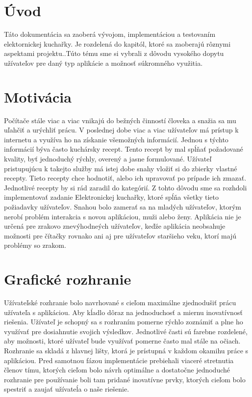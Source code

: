 \documentclass[12pt,a4paper,titlepage,final]{article}
\begin{document}


\tableofcontents
\newpage

\section{Úvod}
Táto dokumentácia sa zaoberá vývojom, implementáciou a testovaním elektornickej kuchařky. Je rozdelená do kapitól, ktoré sa zaoberajú rôznymi aspektami projektu.\cite{Prokop:Algoritmy}.Túto tému sme si vybrali z dôvodu vysokého dopytu užívateľov pre daný typ aplikácie a možnosť súkromného využitia. 


\section{Motivácia}
Počítače stále viac a viac vnikajú do bežných činností človeka a snažia sa mu uľahčiť a urýchliť prácu. V poslednej dobe viac a viac užívateľov má prístup k internetu a využíva ho na získanie všemožných informácií. Jednou s týchto informácií býva často kuchársky recept. Tento recept by mal spĺňať požadované kvality, byť jednoduchý rýchly, overený a jasne formulované. Užívateľ pristupujúcu k takejto služby má istej dobe snahy vložiť si do zbierky vlastné recepty. Tieto recepty chce hodnotiť, alebo ich upravovať po prípade ich zmazať. Jednotlivé recepty by si rád zaradil do kategórií. Z tohto dôvodu sme sa rozhdoli implementovať zadanie Elektronickej kuchařky, ktoré spĺňa všetky tieto požiadavky užívateľov. Snahou bolo zamerať sa na mladých užívateľov, ktorým nerobí problém interakcia s novou aplikáciou, muži alebo ženy. Aplikácia nie je určená pre zrakovo znevýhodneých užívateľov, keďźe aplikácia neobsahuje možnosti pre čítačky rovnako ani aj pre užívateľov staršieho veku, ktorí majú problémy so zrakom.

\section{Grafické rozhranie}
Užívateľské rozhranie bolo navrhované s cieľom maximálne zjednodušiť prácu užívateľa s aplikáciou. Aby kĺadlo dôraz na jednoduchosť a miernu inovatívnosť riešenia. Užívateľ je schopný sa s rozhraním pomerne rýchlo zoznámiť a plne ho využívať pre dosiahnutie svojich výsledkov. Jednotlivé časti sú farebne rozdelené, aby možnosti, ktoré užívateľ bude využívať pomerne často mal stále na očiach. Rozhranie sa skladá z hlavnej lišty, ktorá je prístupná v každom okamihu práce s aplikáciou. Pred samotnou fázou implementácie prebiehali viaceré stretnutia členov tímu, ktorých cieľom bolo návrh optimálne a dostatočne jednoduché rozhranie pre používanie boli tam pridané inovatívne prvky, ktorých cieľom bolo spestriť a zaujať užívateĺa o naše riešenie.\cite{Stephen:Rozhrania}
\end{document}
